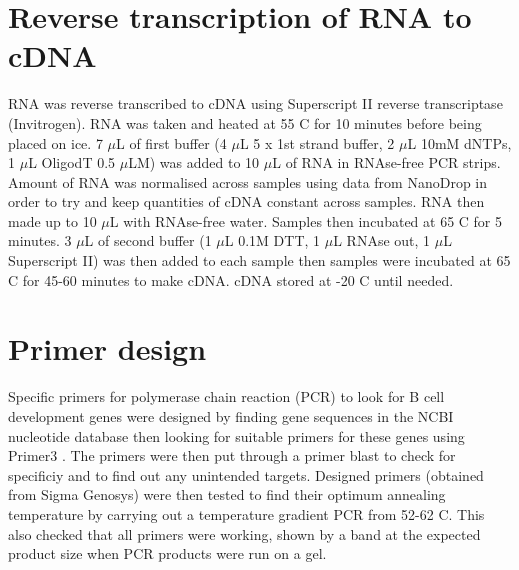 \section{Reverse transcription of RNA to cDNA}

RNA was reverse transcribed to cDNA using Superscript II reverse transcriptase (Invitrogen).
RNA was taken and heated at 55 \textdegree C for 10 minutes before being placed on ice.
7 $\mu$L of first buffer (4 $\mu$L 5 x 1st strand buffer, 2 $\mu$L 10mM dNTPs, 1 $\mu$L OligodT 0.5 $\mu$LM) was added to 10 $\mu$L of RNA in RNAse-free PCR strips.
Amount of RNA was normalised across samples using data from NanoDrop in order to try and keep quantities of cDNA constant across samples.
RNA then made up to 10 $\mu$L with RNAse-free water.
Samples then incubated at 65 \textdegree C for 5 minutes.
3 $\mu$L of second buffer (1 $\mu$L 0.1M DTT, 1 $\mu$L RNAse out, 1 $\mu$L Superscript II) was then added to each sample then samples were incubated at 65 \textdegree C for 45-60 minutes to make cDNA.
cDNA stored at -20 \textdegree C until needed.

\section{Primer design}

Specific primers for polymerase chain reaction (PCR) to look for B cell development genes were designed by finding gene sequences in the NCBI nucleotide database \citep{NCBIdatabase} then looking for suitable primers for these genes using Primer3 \citep{Primer3}.
The primers were then put through a primer blast \citep{Primerblast} to check for specificiy and to find out any unintended targets.
Designed primers (obtained from Sigma Genosys) were then tested to find their optimum annealing temperature by carrying out a temperature gradient PCR from 52-62 \textdegree C.
This also checked that all primers were working, shown by a band at the expected product size when PCR products were run on a gel.

